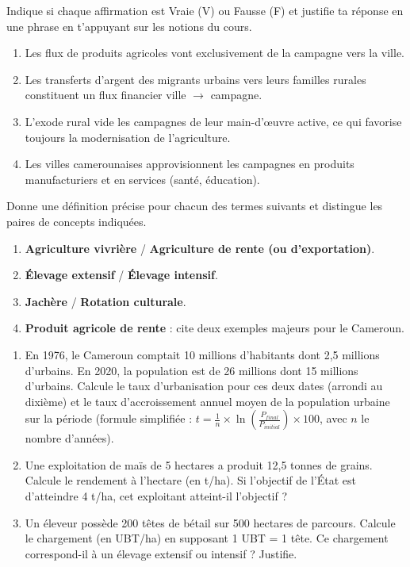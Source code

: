 \documentclass[11pt]{article}
\begin{document}
\begin{exercice}
Indique si chaque affirmation est Vraie (V) ou Fausse (F) et justifie ta réponse en une phrase en t'appuyant sur les notions du cours.
\begin{enumerate}
\item Les flux de produits agricoles vont exclusivement de la campagne vers la ville.
\item Les transferts d'argent des migrants urbains vers leurs familles rurales constituent un flux financier ville $\to$ campagne.
\item L'exode rural vide les campagnes de leur main-d'œuvre active, ce qui favorise toujours la modernisation de l'agriculture.
\item Les villes camerounaises approvisionnent les campagnes en produits manufacturiers et en services (santé, éducation).
\end{enumerate}
\end{exercice}

\begin{exercice}
Donne une définition précise pour chacun des termes suivants et distingue les paires de concepts indiquées.
\begin{enumerate}
\item \textbf{Agriculture vivrière} / \textbf{Agriculture de rente (ou d'exportation)}.
\item \textbf{Élevage extensif} / \textbf{Élevage intensif}.
\item \textbf{Jachère} / \textbf{Rotation culturale}.
\item \textbf{Produit agricole de rente} : cite deux exemples majeurs pour le Cameroun.
\end{enumerate}
\end{exercice}

\begin{exercice}
\begin{enumerate}
\item En 1976, le Cameroun comptait 10 millions d'habitants dont 2,5 millions d'urbains. En 2020, la population est de 26 millions dont 15 millions d'urbains. Calcule le taux d'urbanisation pour ces deux dates (arrondi au dixième) et le taux d'accroissement annuel moyen de la population urbaine sur la période (formule simplifiée : $t = \frac{1}{n} \times \ln\left(\frac{P_{final}}{P_{initial}}\right) \times 100$, avec $n$ le nombre d'années).
\item Une exploitation de maïs de 5 hectares a produit 12,5 tonnes de grains. Calcule le rendement à l'hectare (en t/ha). Si l'objectif de l'État est d'atteindre 4 t/ha, cet exploitant atteint-il l'objectif ?
\item Un éleveur possède 200 têtes de bétail sur 500 hectares de parcours. Calcule le chargement (en UBT/ha) en supposant 1 UBT = 1 tête. Ce chargement correspond-il à un élevage extensif ou intensif ? Justifie.
\end{enumerate}
\end{exercice}
\end{document}
